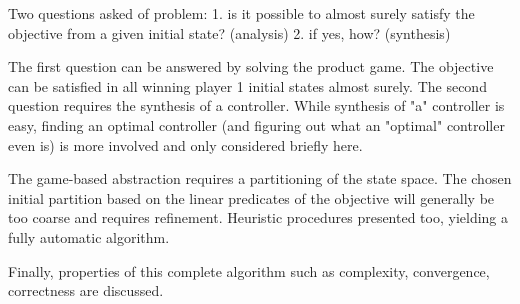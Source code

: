 Two questions asked of problem:
1. is it possible to almost surely satisfy the objective from a given initial state? (analysis)
2. if yes, how? (synthesis)

The first question can be answered by solving the product game.
The objective can be satisfied in all winning player 1 initial states almost surely.
The second question requires the synthesis of a controller.
While synthesis of "a" controller is easy, finding an optimal controller (and figuring out what an "optimal" controller even is) is more involved and only considered briefly here.

The game-based abstraction requires a partitioning of the state space.
The chosen initial partition based on the linear predicates of the objective will generally be too coarse and requires refinement.
Heuristic procedures presented too, yielding a fully automatic algorithm.

Finally, properties of this complete algorithm such as complexity, convergence, correctness are discussed.

